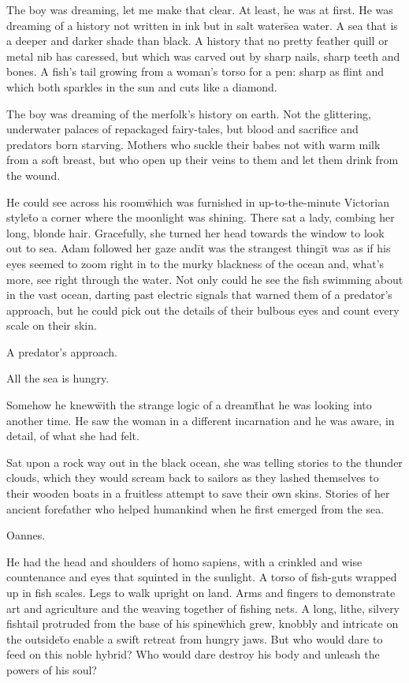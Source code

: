 


\prelude

The boy was dreaming, let me make that clear. At least, he was at
first. He was dreaming of a history not written in ink but in salt
water\=sea water. A sea that is a deeper and darker shade than
black. A history that no pretty feather quill or metal nib has
caressed, but which was carved out by sharp nails, sharp teeth and
bones. A fish’s tail growing from a woman’s torso for a pen: sharp as
flint and which both sparkles in the sun and cuts like a diamond.

The boy was dreaming of the merfolk’s history on earth. Not the
glittering, underwater palaces of repackaged fairy-tales, but blood
and sacrifice and predators born starving. Mothers who suckle their
babes not with warm milk from a soft breast, but who open up their
veins to them and let them drink from the wound.

He could see across his room\=which was furnished in up-to-the-minute
Victorian style\=to a corner where the moonlight was shining. There
sat a lady, combing her long, blonde hair. Gracefully, she turned her
head towards the window to look out to sea. Adam followed her gaze
and\=it was the strangest thing\=it was as if his eyes seemed to zoom
right in to the murky blackness of the ocean and, what’s more, see
right through the water. Not only could he see the fish swimming about
in the vast ocean, darting past electric signals that warned them of a
predator’s approach, but he could pick out the details of their
bulbous eyes and count every scale on their skin.

A predator’s approach.

All the sea is hungry.

Somehow he knew\=with the strange logic of a dream\=that he was
looking into another time. He saw the woman in a different incarnation
and he was aware, in detail, of what she had felt.

Sat upon a rock way out in the black ocean, she was telling stories to
the thunder clouds, which they would scream back to sailors as they
lashed themselves to their wooden boats in a fruitless attempt to save
their own skins. Stories of her ancient forefather who helped
humankind when he first emerged from the sea.

Oannes.

He had the head and shoulders of homo sapiens, with a crinkled and wise
countenance and eyes that squinted in the sunlight. A torso of
fish-guts wrapped up in fish scales. Legs to walk upright on
land. Arms and fingers to demonstrate art and agriculture and the
weaving together of fishing nets. A long, lithe, silvery fishtail
protruded from the base of his spine\=which grew, knobbly and
intricate on the outside\=to enable a swift retreat from hungry
jaws. But who would dare to feed on this noble hybrid? Who would dare
destroy his body and unleash the powers of his soul?

